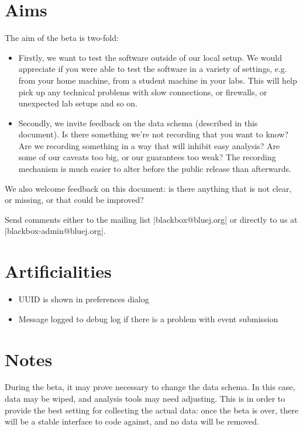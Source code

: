\documentclass{report}
\begin{document}
\section{Aims}

The aim of the beta is two-fold:

\begin{itemize}
\item Firstly, we want to test the software outside of our local setup.  We
  would appreciate if you were able to test the software in a variety of
  settings, e.g. from your home machine, from a student machine in your labs.
  This will help pick up any technical problems with slow connections, or
  firewalls, or unexpected lab setups and so on.
\item Secondly, we invite feedback on the data schema (described in
  this document).  Is there something we're not recording that you want to
  know?  Are we recording something in a way that will inhibit easy
  analysis?  Are some of our caveats too big, or our guarantees too
  weak?  The recording mechanism is much easier to alter before the
  public release than afterwards.
\end{itemize}

We also welcome feedback on this document: is there anything that is
not clear, or missing, or that could be improved?

Send comments either to the mailing list |blackbox@bluej.org| or
directly to us at |blackbox-admin@bluej.org|.

\section{Artificialities}

\begin{itemize}
\item UUID is shown in preferences dialog
\item Message logged to debug log if there is a problem with event submission
\end{itemize}

\section{Notes}

During the beta, it may prove necessary to change the data schema.  In this
case, data may be wiped, and analysis tools may need adjusting.  This is in
order to provide the best setting for collecting the actual data: once the
beta is over, there will be a stable interface to code against, and no data
will be removed.
\end{document}
